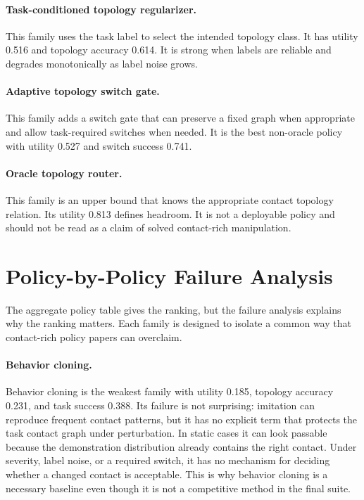 \documentclass{article}
\begin{document}
\paragraph{Task-conditioned topology regularizer.}
This family uses the task label to select the intended topology class. It has utility 0.516 and topology accuracy 0.614. It is strong when labels are reliable and degrades monotonically as label noise grows.

\paragraph{Adaptive topology switch gate.}
This family adds a switch gate that can preserve a fixed graph when appropriate and allow task-required switches when needed. It is the best non-oracle policy with utility 0.527 and switch success 0.741.

\paragraph{Oracle topology router.}
This family is an upper bound that knows the appropriate contact topology relation. Its utility 0.813 defines headroom. It is not a deployable policy and should not be read as a claim of solved contact-rich manipulation.

\section{Policy-by-Policy Failure Analysis}

The aggregate policy table gives the ranking, but the failure analysis explains why the ranking matters. Each family is designed to isolate a common way that contact-rich policy papers can overclaim.

\paragraph{Behavior cloning.}
Behavior cloning is the weakest family with utility 0.185, topology accuracy 0.231, and task success 0.388. Its failure is not surprising: imitation can reproduce frequent contact patterns, but it has no explicit term that protects the task contact graph under perturbation. In static cases it can look passable because the demonstration distribution already contains the right contact. Under severity, label noise, or a required switch, it has no mechanism for deciding whether a changed contact is acceptable. This is why behavior cloning is a necessary baseline even though it is not a competitive method in the final suite.
\end{document}

